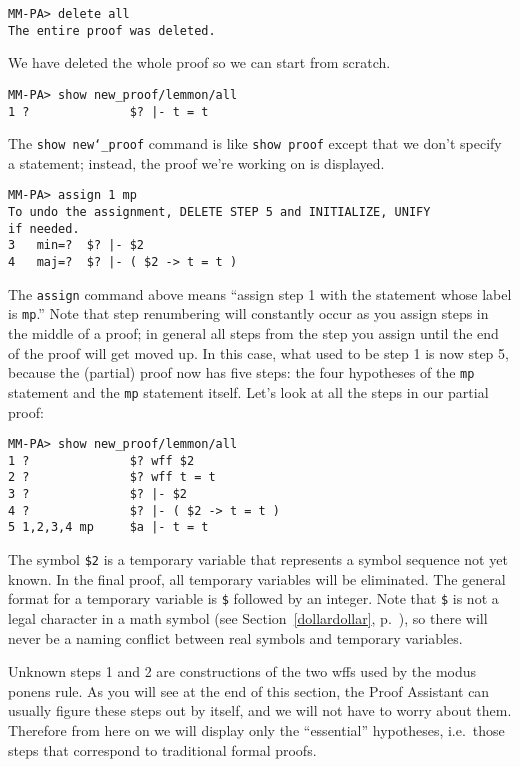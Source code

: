 \begin{verbatim}
MM-PA> delete all
The entire proof was deleted.
\end{verbatim}

We have deleted the whole proof so we can start from scratch.

\begin{verbatim}
MM-PA> show new_proof/lemmon/all
1 ?              $? |- t = t
\end{verbatim}

The \texttt{show new{\char`\_}proof} command is like \texttt{show proof} except that we
don't specify a statement; instead, the proof we're working on is
displayed.

\begin{verbatim}
MM-PA> assign 1 mp
To undo the assignment, DELETE STEP 5 and INITIALIZE, UNIFY
if needed.
3   min=?  $? |- $2
4   maj=?  $? |- ( $2 -> t = t )
\end{verbatim}

The \texttt{assign} command above means
``assign step 1 with the statement whose label is \texttt{mp}.''  Note
that step renumbering will constantly occur as you assign steps in the
middle of a proof; in general all steps from the step you assign until
the end of the proof will get moved up.  In this case, what used to be
step 1 is now step 5, because the (partial) proof now has five steps:
the four hypotheses of the \texttt{mp} statement and the \texttt{mp}
statement itself.  Let's look at all the steps in our partial proof:

\begin{verbatim}
MM-PA> show new_proof/lemmon/all
1 ?              $? wff $2
2 ?              $? wff t = t
3 ?              $? |- $2
4 ?              $? |- ( $2 -> t = t )
5 1,2,3,4 mp     $a |- t = t
\end{verbatim}

The symbol \texttt{\$2} is a temporary variable that represents a symbol sequence not yet known.  In the final
proof, all temporary variables will be eliminated.  The general format
for a temporary variable is \texttt{\$} followed by an integer.  Note
that \texttt{\$} is not a legal character in a math symbol (see
Section~\ref{dollardollar}, p.~\pageref{dollardollar}), so there will
never be a naming conflict between real symbols and temporary variables.

Unknown steps 1 and 2 are constructions of the two wffs used by the
modus ponens rule.  As you will see at the end of this section, the
Proof Assistant can usually figure these steps
out by itself, and we will not have to worry about them.  Therefore from
here on we will display only the ``essential'' hypotheses, i.e.\ those
steps that correspond to traditional formal proofs.

